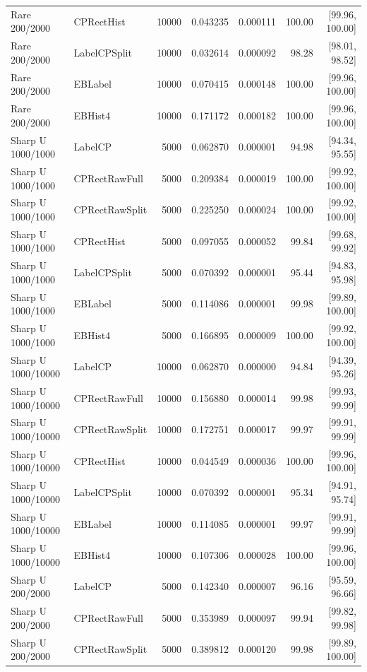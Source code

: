 \begin{longtable}{llrrrrr}
Rare 200/2000 & CPRectHist & 10000 & 0.043235 & 0.000111 & 100.00 & [99.96, 100.00]\\
Rare 200/2000 & LabelCPSplit & 10000 & 0.032614 & 0.000092 & 98.28 & [98.01, 98.52]\\
Rare 200/2000 & EBLabel & 10000 & 0.070415 & 0.000148 & 100.00 & [99.96, 100.00]\\
Rare 200/2000 & EBHist4 & 10000 & 0.171172 & 0.000182 & 100.00 & [99.96, 100.00]\\
Sharp U 1000/1000 & LabelCP & 5000 & 0.062870 & 0.000001 & 94.98 & [94.34, 95.55]\\
Sharp U 1000/1000 & CPRectRawFull & 5000 & 0.209384 & 0.000019 & 100.00 & [99.92, 100.00]\\
Sharp U 1000/1000 & CPRectRawSplit & 5000 & 0.225250 & 0.000024 & 100.00 & [99.92, 100.00]\\
Sharp U 1000/1000 & CPRectHist & 5000 & 0.097055 & 0.000052 & 99.84 & [99.68, 99.92]\\
Sharp U 1000/1000 & LabelCPSplit & 5000 & 0.070392 & 0.000001 & 95.44 & [94.83, 95.98]\\
Sharp U 1000/1000 & EBLabel & 5000 & 0.114086 & 0.000001 & 99.98 & [99.89, 100.00]\\
Sharp U 1000/1000 & EBHist4 & 5000 & 0.166895 & 0.000009 & 100.00 & [99.92, 100.00]\\
Sharp U 1000/10000 & LabelCP & 10000 & 0.062870 & 0.000000 & 94.84 & [94.39, 95.26]\\
Sharp U 1000/10000 & CPRectRawFull & 10000 & 0.156880 & 0.000014 & 99.98 & [99.93, 99.99]\\
Sharp U 1000/10000 & CPRectRawSplit & 10000 & 0.172751 & 0.000017 & 99.97 & [99.91, 99.99]\\
Sharp U 1000/10000 & CPRectHist & 10000 & 0.044549 & 0.000036 & 100.00 & [99.96, 100.00]\\
Sharp U 1000/10000 & LabelCPSplit & 10000 & 0.070392 & 0.000001 & 95.34 & [94.91, 95.74]\\
Sharp U 1000/10000 & EBLabel & 10000 & 0.114085 & 0.000001 & 99.97 & [99.91, 99.99]\\
Sharp U 1000/10000 & EBHist4 & 10000 & 0.107306 & 0.000028 & 100.00 & [99.96, 100.00]\\
Sharp U 200/2000 & LabelCP & 5000 & 0.142340 & 0.000007 & 96.16 & [95.59, 96.66]\\
Sharp U 200/2000 & CPRectRawFull & 5000 & 0.353989 & 0.000097 & 99.94 & [99.82, 99.98]\\
Sharp U 200/2000 & CPRectRawSplit & 5000 & 0.389812 & 0.000120 & 99.98 & [99.89, 100.00]\\

\end{longtable}

